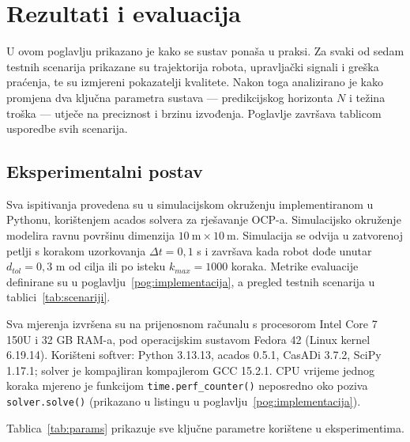 
\chapter{Rezultati i evaluacija}
\label{pog:rezultati}

U ovom poglavlju prikazano je kako se sustav ponaša u praksi. Za svaki od sedam testnih scenarija prikazane su trajektorija robota, upravljački signali i greška praćenja, te su izmjereni pokazatelji kvalitete. Nakon toga analizirano je kako promjena dva ključna parametra sustava --- predikcijskog horizonta $N$ i težina troška --- utječe na preciznost i brzinu izvođenja. Poglavlje završava tablicom usporedbe svih scenarija.

\FloatBarrier
\section{Eksperimentalni postav}
\label{sec:r_postav}

Sva ispitivanja provedena su u simulacijskom okruženju implementiranom u Pythonu, korištenjem acados solvera za rješavanje OCP-a. Simulacijsko okruženje modelira ravnu površinu dimenzija $10\ \text{m} \times 10\ \text{m}$. Simulacija se odvija u zatvorenoj petlji s korakom uzorkovanja $\Delta t = 0{,}1$ s i završava kada robot dođe unutar $d_{tol} = 0{,}3$ m od cilja ili po isteku $k_{max} = 1000$ koraka. Metrike evaluacije definirane su u poglavlju~\ref{pog:implementacija}, a pregled testnih scenarija u tablici~\ref{tab:scenariji}.

Sva mjerenja izvršena su na prijenosnom računalu s procesorom Intel Core 7 150U i 32 GB RAM-a, pod operacijskim sustavom Fedora 42 (Linux kernel 6.19.14). Korišteni softver: Python 3.13.13, acados 0.5.1, CasADi 3.7.2, SciPy 1.17.1; solver je kompajliran kompajlerom GCC 15.2.1. CPU vrijeme jednog koraka mjereno je funkcijom \texttt{time.perf\_counter()} neposredno oko poziva \texttt{solver.solve()} (prikazano u listingu u poglavlju~\ref{pog:implementacija}).

Tablica~\ref{tab:params} prikazuje sve ključne parametre korištene u eksperimentima.

